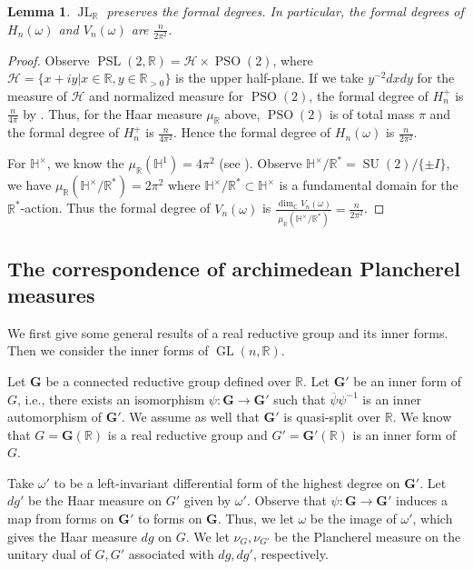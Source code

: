 \documentclass[11pt]{article}
\theoremstyle{plain}
\newtheorem{lemma}[theorem]{Lemma}
\theoremstyle{remark}
\theoremstyle{definition}
\DeclareMathOperator{\GL}{GL}
\DeclareMathOperator{\PSL}{PSL}
\DeclareMathOperator{\JL}{JL}
\DeclareMathOperator{\SU}{SU}
\DeclareMathOperator{\PSO}{PSO}
\begin{document}
\begin{lemma}\label{larc2H}
$\JL_{\mathbb{R}}$ preserves the formal degrees. 
In particular, the formal degrees of $H_n(\omega)$ and $V_n(\omega)$ are $\frac{n}{2\pi^2}$. 
\end{lemma}
\begin{proof}
Observe $\PSL(2,\mathbb{R})=\mathcal{H}\times \PSO(2)$, where $\mathcal{H}=\{x+iy|x\in\mathbb{R},y\in \mathbb{R}_{>0}\}$ is the upper half-plane. 
If we take $y^{-2}dxdy$ for the measure of $\mathcal{H}$ and normalized measure for $\PSO(2)$, the formal degree of $H^+_n$ is $\frac{n}{4\pi}$ by \cite[\S 3.3.d]{GHJ}. 
Thus, for the Haar measure $\mu_{\mathbb{R}}$ above, $\PSO(2)$ is of total mass $\pi$ and the formal degree of $H_{n}^+$ is $\frac{n}{4\pi^2}$. 
Hence the formal degree of $H_n(\omega)$ is $\frac{n}{2\pi^2}$. 

For $\mathbb{H}^\times$, we know the $\mu_{\mathbb{R}}(\mathbb{H}^1)=4\pi^2$ (see \cite[Lemma 29.5.9]{Voight21}). 
Observe $\mathbb{H}^{\times}/\mathbb{R}^{*}=\SU(2)/\{\pm I\}$, we have $\mu_{\mathbb{R}}(\mathbb{H}^{\times}/\mathbb{R}^{*})=2\pi^2$ where $\mathbb{H}^{\times}/\mathbb{R}^{*}\subset \mathbb{H}^{\times}$ is a fundamental domain for the $\mathbb{R}^*$-action. 
Thus the formal degree of $V_n(\omega)$ is $\frac{\dim_{\mathbb{C}}{V_n(\omega)}}{\mu_{\mathbb{R}}(\mathbb{H}^{\times}/\mathbb{R}^{*})}=\frac{n}{2\pi^2}$. 
\end{proof}

\subsection{The correspondence of archimedean Plancherel measures}\label{ssJLR}

We first give some general results of a real reductive group and its inner forms. 
Then we consider the inner forms of $\GL(n,\mathbb{R})$. 


Let $\mathbf{G}$ be a connected reductive group defined over $\mathbb{R}$. 
Let $\mathbf{G}'$ be an inner form of $G$, i.e., there exists an isomorphism $\psi\colon \mathbf{G} \to \mathbf{G}'$ such that $\overline{\psi}\psi^{-1}$ is an inner automorphism of $\mathbf{G}'$. 
We assume as well that $\mathbf{G}'$ is quasi-split over $\mathbb{R}$. 
We know that $G=\mathbf{G}(\mathbb{R})$ is a real reductive group and $G'=\mathbf{G}'(\mathbb{R})$ is an inner form of $G$. 

Take $\omega'$ to be a left-invariant differential form of the highest degree on $\mathbf{G}'$. 
Let $dg'$ be the Haar measure on $G'$ given by $\omega'$. 
Observe that $\psi\colon \mathbf{G}\to \mathbf{G}'$  induces a map from forms on $\mathbf{G}'$ to forms on $\mathbf{G}$. 
Thus, we let $\omega$ be the image of $\omega'$, which gives the Haar measure $dg$ on $G$. 
We let $\nu_G,\nu_{G'}$ be the Plancherel measure on the unitary dual of $G,G'$ associated with $dg,dg'$, respectively. 
\end{document}

